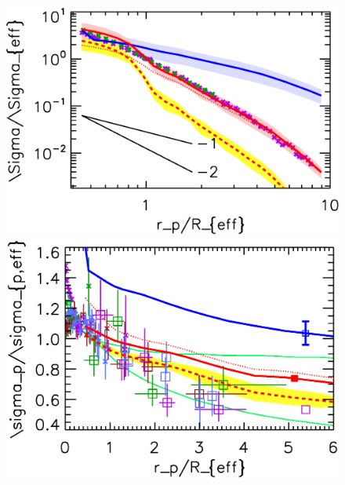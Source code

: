 \documentclass[a4paper,usenatbib,usegraphicx,twocolumn]{report}
\begin{document}
\pagestyle{empty}
\onecolumn

\begin{figure}
\centering \includegraphics[width=120mm]{rho2dstack.eps}
\centering \includegraphics[width=120mm]{sigma2dstack.eps}
\end{figure}
\end{document}
